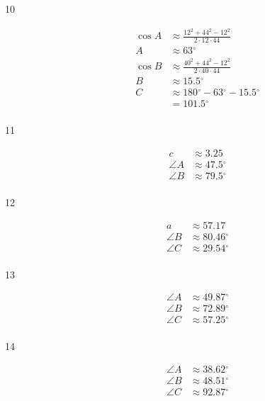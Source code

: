 \documentclass{exam}
\newcommand{\dg}{\ensuremath{^\circ}}
\begin{document}
\begin{description}
      \item[10] 
        \begin{align*}
          \cos A & \approx \frac{ 12^2 + 44^2 - 12^2}{2 \cdot 12 \cdot 44} \\
          A      & \approx \boxed{ 63 \dg }
          \\
          \cos B & \approx \frac{ 40^2 + 44^2 - 12^2}{2 \cdot 40 \cdot 44} \\
          B      & \approx \boxed{ 15.5 \dg }
          \\
          C & \approx 180 \dg - 63 \dg - 15.5 \dg \\
            & = \boxed{ 101.5 \dg } \\
        \end{align*}

      \item[11]
        \begin{align*}
          c        & \approx 3.25 \\
          \angle A & \approx 47.5 \dg \\
          \angle B & \approx 79.5 \dg \\
        \end{align*}

      \item[12]
        \begin{align*}
          a        & \approx 57.17 \\
          \angle B & \approx 80.46 \dg \\
          \angle C & \approx 29.54 \dg \\
        \end{align*}

      \item[13]
        \begin{align*}
          \angle A & \approx 49.87 \dg \\
          \angle B & \approx 72.89 \dg \\
          \angle C & \approx 57.25 \dg \\
        \end{align*}

      \item[14]
        \begin{align*}
          \angle A & \approx 38.62 \dg \\
          \angle B & \approx 48.51 \dg \\
          \angle C & \approx 92.87 \dg \\
        \end{align*}


\end{description}
\end{document}
